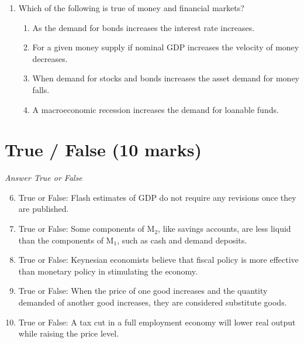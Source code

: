\documentclass[12pt]{article}
\begin{document}
\begin{enumerate}[label=\arabic*.]
\begin{enumerate}[label=(\alph*)]
    \item The equilibrium price will fall and the equilibrium quantity will rise.
    \item The equilibrium price and the equilibrium quantity will both rise.
    \item The equilibrium price and the equilibrium quantity will both fall.
\end{enumerate}
\item Which of the following is true of money and financial markets?
\begin{enumerate}[label=(\alph*)]
    \item As the demand for bonds increases the interest rate increases.
    \item For a given money supply if nominal GDP increases the velocity of money decreases.
    \item When demand for stocks and bonds increases the asset demand for money falls.
    \item A macroeconomic recession increases the demand for loanable funds.
\end{enumerate}
\end{enumerate}

\section*{True / False (10 marks)}
\textit{Answer True or False}
\begin{enumerate}[label=\arabic*.]
\setcounter{enumi}{5}
\item True or False: Flash estimates of GDP do not require any revisions once they are published.
\item True or False: Some components of M$_{2}$, like savings accounts, are less liquid than the components of M$_{1}$, such as cash and demand deposits.
\item True or False: Keynesian economists believe that fiscal policy is more effective than monetary policy in stimulating the economy.
\item True or False: When the price of one good increases and the quantity demanded of another good increases, they are considered substitute goods.
\item True or False: A tax cut in a full employment economy will lower real output while raising the price level.
\end{enumerate}
\end{document}

